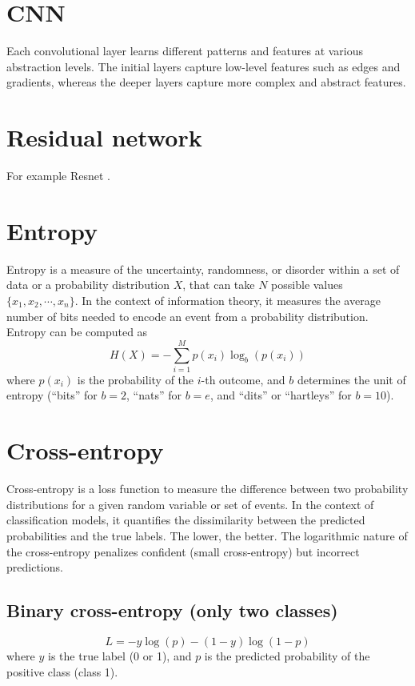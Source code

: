 \section{CNN}
Each convolutional layer learns different patterns and features at
various abstraction levels. The initial layers capture low-level features such
as edges and gradients, whereas the deeper layers capture more complex and
abstract features.

\section{Residual network}
For example Resnet \cite{}.

\section{Entropy}
Entropy is a measure of the uncertainty, randomness, or disorder
within a set of data or a probability distribution $X$, that can take
$N$ possible values $\{x_1,x_2,\cdots,x_n\}$. In the context of
information theory, it measures the average number of bits needed to
encode an event from a probability distribution. Entropy can be
computed as
\begin{equation}
  H(X) = -\sum_{i=1}^Mp(x_i)\log_b(p(x_i))
\end{equation}
where $p(x_i)$ is the probability of the $i$-th outcome, and $b$
determines the unit of entropy (``bits'' for $b=2$, ``nats'' for
$b=e$, and ``dits'' or ``hartleys'' for $b=10$).

\section{Cross-entropy}
Cross-entropy is a loss function to measure the difference between two
probability distributions for a given random variable or set of
events. In the context of classification models, it quantifies the
dissimilarity between the predicted probabilities and the true
labels. The lower, the better. The logarithmic nature of the
cross-entropy penalizes confident (small cross-entropy) but incorrect
predictions.

\subsection{Binary cross-entropy (only two classes)}
\begin{equation}
  L = -y\log(p)-(1-y)\log(1-p)
\end{equation}
where $y$ is the true label (0 or 1), and $p$ is the predicted probability of the positive class (class 1).

